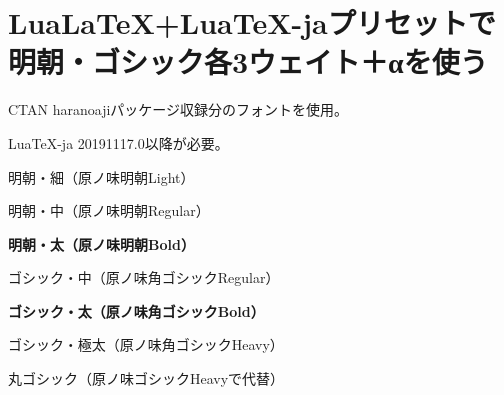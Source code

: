\documentclass{ltjsarticle}
\begin{document}
\section{Lua\LaTeX +Lua\TeX -jaプリセットで明朝・ゴシック各3ウェイト＋αを使う}

CTAN haranoajiパッケージ収録分のフォントを使用。

Lua\TeX -ja 20191117.0以降が必要。

\vspace{\baselineskip}

\rmfamily
\mcfamily
\ltseries
明朝・細（原ノ味明朝Light）

\mdseries
明朝・中（原ノ味明朝Regular）

\bfseries
明朝・太（原ノ味明朝Bold）

\sffamily
\gtfamily
\mdseries
ゴシック・中（原ノ味角ゴシックRegular）

\bfseries
ゴシック・太（原ノ味角ゴシックBold）

\ebseries
ゴシック・極太（原ノ味角ゴシックHeavy）

\mgfamily
\mdseries
丸ゴシック（原ノ味ゴシックHeavyで代替）
\end{document}
